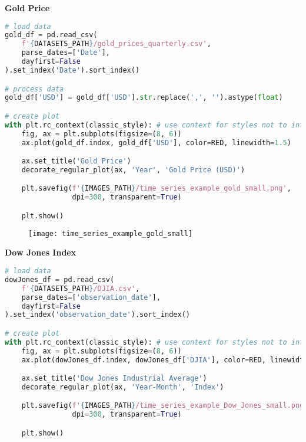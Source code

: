 {\noindent\hspace{-12.5pt}\normalsize\bfseries Gold Price}\vspace{-10pt}
\begin{center}
  \begin{lstlisting}[language=Python, 
  caption={Стоимость золота в долларах.}, 
  label={lst:time_series_example_gold_small}]
# load data
gold_df = pd.read_csv(
    f'{DATASETS_PATH}/gold_prices_quarterly.csv',
    parse_dates=['Date'],
    dayfirst=False
).set_index('Date').sort_index()

# process data
gold_df['USD'] = gold_df['USD'].str.replace(',', '').astype(float)

# create plot
with plt.rc_context(classic_style): # use context for styles not to interfere
    fig, ax = plt.subplots(figsize=(8, 6))
    ax.plot(gold_df.index, gold_df['USD'], color=RED, linewidth=1.5)

    ax.set_title('Gold Price')
    decorate_regular_plot(ax, 'Year', 'Gold Price (USD)')

    plt.savefig(f'{IMAGES_PATH}/time_series_example_gold_small.png', 
                dpi=300, transparent=True)

    plt.show()
  \end{lstlisting}
\end{center}

\begin{figure}[h!]
  \centering
  \texttt{[image: time\_series\_example\_gold\_small]}
\end{figure}\newpage


{\noindent\hspace{-12.5pt}\normalsize\bfseries Dow Jones Index}\vspace{-10pt}
\begin{center}
  \begin{lstlisting}[language=Python, 
  caption={Промышленный индекс Доу Джонса.}, 
  label={lst:time_series_example_Dow_Jones_small}]
# load data
dowJones_df = pd.read_csv(
    f'{DATASETS_PATH}/DJIA.csv',
    parse_dates=['observation_date'],
    dayfirst=False
).set_index('observation_date').sort_index()

# create plot
with plt.rc_context(classic_style): # use context for styles not to interfere
    fig, ax = plt.subplots(figsize=(8, 6))
    ax.plot(dowJones_df.index, dowJones_df['DJIA'], color=RED, linewidth=1.5)

    ax.set_title('Dow Jones Industrial Average')
    decorate_regular_plot(ax, 'Year-Month', 'Index')

    plt.savefig(f'{IMAGES_PATH}/time_series_example_Dow_Jones_small.png', 
                dpi=300, transparent=True)

    plt.show()
  \end{lstlisting}
\end{center}


